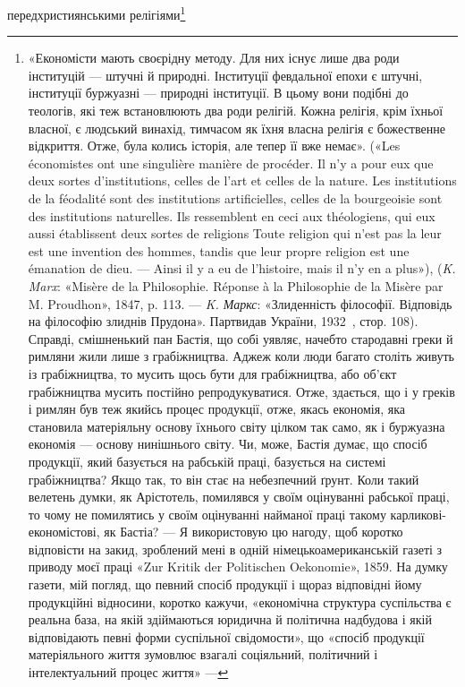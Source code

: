 передхристиянськими релігіями\footnote{
«Економісти мають своєрідну методу. Для них існує лише два
роди інституцій — штучні й природні. Інституції февдальної епохи є
штучні, інституції буржуазні — природні інституції. В цьому вони
подібні до теологів, які теж встановлюють два роди релігій. Кожна релігія,
крім їхньої власної, є людський винахід, тимчасом як їхня власна
релігія є божественне відкриття. Отже, була колись історія, але тепер
її вже немає». («Les économistes ont une singulière manière de procéder.
Il n’y a pour eux que deux sortes d’institutions, celles de l’art et celles de
la nature. Les institutions de la féodalité sont des institutions artificielles,
celles de la bourgeoisie sont des institutions naturelles. Ils ressemblent
en ceci aux théologiens, qui eux aussi établissent deux sortes de religions
Toute religion qui n’est pas la leur est une invention des hommes, tandis
que leur propre religion est une émanation de dieu. — Ainsi il y a eu de
l’histoire, mais il n’y en a plus»), (\emph{K. Marx}: «Misère de la Philosophie.
Réponse à la Philosophie de la Misère par M. Proudhon», 1847, p. 113. —
\emph{K. Маркс}: «Злиденність філософії. Відповідь на філософію злиднів
Прудона». Партвидав України, 1932~, стор. 108). Справді, смішненький
пан Бастія, що собі уявляє, начебто стародавні греки й римляни жили
лише з грабіжництва. Аджеж коли люди багато століть живуть із грабіжництва,
то мусить щось бути для грабіжництва, або об’єкт грабіжництва
мусить постійно репродукуватися. Отже, здається, що і у греків і
римлян був теж якийсь процес продукції, отже, якась економія, яка
становила матеріяльну основу їхнього світу цілком так само, як і буржуазна
економія — основу нинішнього світу. Чи, може, Бастія думає,
що спосіб продукції, який базується на рабській праці, базується на системі
грабіжництва? Якщо так, то він стає на небезпечний ґрунт. Коли
такий велетень думки, як Арістотель, помилявся у своїм оцінуванні рабської
праці, то чому не помилятись у своїм оцінуванні найманої праці
такому карликові-економістові, як Бастіа? — Я використовую цю нагоду,
щоб коротко відповісти на закид, зроблений мені в одній німецькоамериканській
газеті з приводу моєї праці «Zur Kritik der Politischen
Oekonomie», 1859. На думку газети, мій погляд, що певний спосіб продукції
і щораз відповідні йому продукційні відносини, коротко кажучи,
«економічна структура суспільства є реальна база, на якій здіймаються
юридична й політична надбудова і якій відповідають певні форми
суспільної свідомости», що «спосіб продукції матеріяльного життя зумовлює
взагалі соціяльний, політичний і інтелектуальний процес життя» —
}
